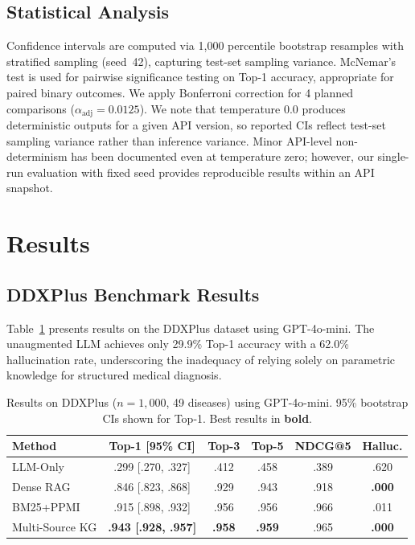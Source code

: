 \documentclass[runningheads]{llncs}
\begin{document}
\subsection{Statistical Analysis}

Confidence intervals are computed via 1,000 percentile bootstrap resamples with stratified sampling (seed~42), capturing test-set sampling variance. McNemar's test is used for pairwise significance testing on Top-1 accuracy, appropriate for paired binary outcomes. We apply Bonferroni correction for 4 planned comparisons ($\alpha_{\text{adj}} = 0.0125$). We note that temperature 0.0 produces deterministic outputs for a given API version, so reported CIs reflect test-set sampling variance rather than inference variance. Minor API-level non-determinism has been documented even at temperature zero; however, our single-run evaluation with fixed seed provides reproducible results within an API snapshot.

\section{Results}
\label{sec:results}

\subsection{DDXPlus Benchmark Results}

Table~\ref{tab:ddxplus} presents results on the DDXPlus dataset using GPT-4o-mini. The unaugmented LLM achieves only 29.9\% Top-1 accuracy with a 62.0\% hallucination rate, underscoring the inadequacy of relying solely on parametric knowledge for structured medical diagnosis.

\begin{table}[t]
\centering
\caption{Results on DDXPlus ($n{=}1{,}000$, 49 diseases) using GPT-4o-mini. 95\% bootstrap CIs shown for Top-1. Best results in \textbf{bold}.}
\label{tab:ddxplus}
\begin{tabular}{lccccc}
\toprule
\textbf{Method} & \textbf{Top-1 [95\% CI]} & \textbf{Top-3} & \textbf{Top-5} & \textbf{NDCG@5} & \textbf{Halluc.} \\
\midrule
LLM-Only       & .299 [.270, .327] & .412 & .458 & .389 & .620 \\
Dense RAG       & .846 [.823, .868] & .929 & .943 & .918 & \textbf{.000} \\
BM25+PPMI       & .915 [.898, .932] & .956 & .956 & .966 & .011 \\
Multi-Source KG & \textbf{.943 [.928, .957]} & \textbf{.958} & \textbf{.959} & .965 & \textbf{.000} \\
\bottomrule
\end{tabular}
\end{table}
\end{document}
